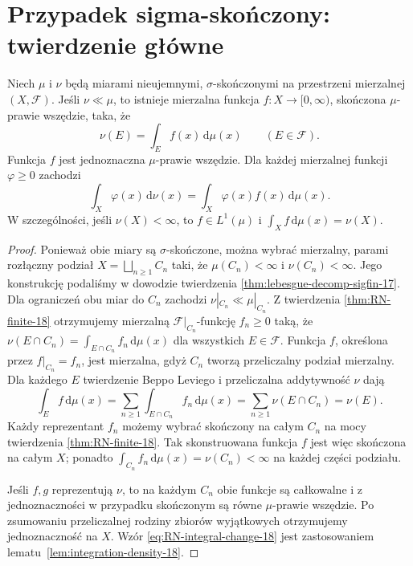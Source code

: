 \section{Przypadek sigma-skończony: twierdzenie główne}
\begin{twierdzenie}
\label{thm:RN-sigfin-18}
Niech $\mu$ i $\nu$ będą miarami nieujemnymi,
$\sigma$-skończonymi na przestrzeni mierzalnej $(X,\mathcal F)$.
Jeśli $\nu\ll\mu$, to istnieje mierzalna funkcja
$f:X\to[0,\infty)$, skończona $\mu$-prawie wszędzie,
taka, że
\begin{equation}\label{eq:RN-general-18}
\nu(E)=\int_E f(x)\,\mathrm d\mu(x)
\qquad(E\in\mathcal F).
\end{equation}
Funkcja $f$ jest jednoznaczna $\mu$-prawie wszędzie.
Dla każdej mierzalnej funkcji $\varphi\ge0$ zachodzi
\begin{equation}\label{eq:RN-integral-change-18}
\int_X\varphi(x)\,\mathrm d\nu(x)
=\int_X\varphi(x)f(x)\,\mathrm d\mu(x).
\end{equation}
W szczególności, jeśli $\nu(X)<\infty$, to
$f\in L^1(\mu)$ i $\int_Xf\,\mathrm d\mu(x)=\nu(X)$.
\end{twierdzenie}
\begin{proof}
Ponieważ obie miary są $\sigma$-skończone,
można wybrać mierzalny, parami rozłączny podział
$X=\bigsqcup_{n\ge1}C_n$ taki, że
$\mu(C_n)<\infty$ i $\nu(C_n)<\infty$.
Jego konstrukcję podaliśmy w dowodzie twierdzenia
\ref{thm:lebesgue-decomp-sigfin-17}.
Dla ograniczeń obu miar do $C_n$ zachodzi
$\nu|_{C_n}\ll\mu|_{C_n}$. Z twierdzenia
\ref{thm:RN-finite-18} otrzymujemy mierzalną
$\mathcal F|_{C_n}$-funkcję $f_n\ge0$ taką, że
$\nu(E\cap C_n)=\int_{E\cap C_n}f_n\,\mathrm d\mu(x)$
dla wszystkich $E\in\mathcal F$.
Funkcja $f$, określona przez $f|_{C_n}=f_n$,
jest mierzalna, gdyż $C_n$ tworzą przeliczalny
podział mierzalny. Dla każdego $E$ twierdzenie
Beppo Leviego i przeliczalna addytywność $\nu$ dają
\[
\int_E f\,\mathrm d\mu(x)
=\sum_{n\ge1}\int_{E\cap C_n}f_n\,\mathrm d\mu(x)
=\sum_{n\ge1}\nu(E\cap C_n)=\nu(E).
\]
Każdy reprezentant $f_n$ możemy wybrać skończony
na całym $C_n$ na mocy twierdzenia \ref{thm:RN-finite-18}.
Tak skonstruowana funkcja $f$ jest więc skończona na całym $X$;
ponadto $\int_{C_n}f_n\,\mathrm d\mu(x)=\nu(C_n)<\infty$
na każdej części podziału.

Jeśli $f,g$ reprezentują $\nu$, to na każdym $C_n$
obie funkcje są całkowalne i z jednoznaczności w
przypadku skończonym są równe $\mu$-prawie wszędzie.
Po zsumowaniu przeliczalnej rodziny zbiorów wyjątkowych
otrzymujemy jednoznaczność na $X$.
Wzór \eqref{eq:RN-integral-change-18} jest zastosowaniem
lematu~\ref{lem:integration-density-18}.
\end{proof}

